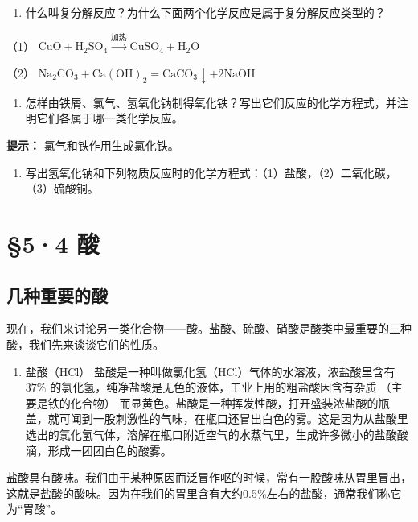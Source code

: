 \begin{enumerate}[start=3]
\item
  什么叫复分解反应？为什么下面两个化学反应是属于复分解反应类型的？
\end{enumerate}

（1） \(\mathrm{CuO + H_2SO_4\xrightarrow{\text{加热}} CuSO_4 + H_2O}\)

（2） \(\mathrm{Na_2CO_3 + Ca(OH)_2 = CaCO_3\downarrow + 2NaOH}\)

\begin{enumerate}[start=4]
\item
  怎样由铁屑、氯气、氢氧化钠制得氧化铁？写出它们反应的化学方程式，并注明它们各属于哪一类化学反应。
\end{enumerate}

\begin{shulihuadef}
\textbf{提示：} 氯气和铁作用生成氯化铁。
\end{shulihuadef}

\begin{enumerate}[start=5]
\item
  写出氢氧化钠和下列物质反应时的化学方程式：（1）盐酸，（2）二氧化碳，（3）硫酸铜。
\end{enumerate}

\section{§5·4 酸}

\subsection{几种重要的酸}

现在，我们来讨论另一类化合物------酸。盐酸、硫酸、硝酸是酸类中最重要的三种酸，我们先来谈谈它们的性质。

\begin{enumerate}
\item
  盐酸（HCl） 盐酸是一种叫做氯化氢（HCl）气体的水溶液，浓盐酸里含有
  \(37\%\) 的氯化氢，纯净盐酸是无色的液体，工业上用的粗盐酸因含有杂质
  （主要是铁的化合物）
  而显黄色。盐酸是一种挥发性酸，打开盛装浓盐酸的瓶盖，就可闻到一股刺激性的气味，在瓶口还冒出白色的雾。这是因为从盐酸里选出的氯化氢气体，溶解在瓶口附近空气的水蒸气里，生成许多微小的盐酸酸滴，形成一团团白色的酸雾。
\end{enumerate}

盐酸具有酸味。我们由于某种原因而泛冒作呕的时候，常有一股酸味从胃里冒出，这就是盐酸的酸味。因为在我们的胃里含有大约0.5\%左右的盐酸，通常我们称它为``胃酸''。


